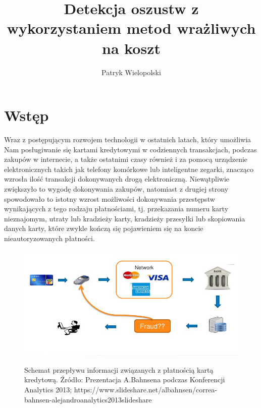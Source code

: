 \documentclass[openany]{book}
\title{Detekcja oszustw z wykorzystaniem metod wrażliwych na koszt}
\author{Patryk Wielopolski}
\begin{document}
	
	\newcommand{\htx}{h_{\theta}(\boldsymbol{x_i})}
	\newcommand{\es}{\mathcal{S}}
	\newcommand{\ef}{\mathcal{F}}
	\newcommand{\iks}{\boldsymbol{x}}
	\newcommand{\bes}{\boldsymbol{S}}
	\newcommand{\yht}[1]{y_i^{(#1)}}
	\newcommand{\ylab}[2]{\text{#1}_{\text{#2}}}
	
	\newenvironment{talign}
	{\align}
	{\endalign}
	
	\newenvironment{talign*}
	{\csname align*\endcsname}
	{\endalign}

\maketitle

\tableofcontents

\chapter{Wstęp}
	Wraz z postępującym rozwojem technologii w ostatnich latach, który umożliwia Nam posługiwanie się kartami kredytowymi w codziennych transakcjach, podczas zakupów w internecie, a także ostatnimi czasy również i za pomocą urządzenie elektronicznych takich jak telefony komórkowe lub inteligentne zegarki, znacząco wzrosła ilość transakcji dokonywanych drogą elektroniczną. Niewątpliwie zwiększyło to wygodę dokonywania zakupów, natomiast z drugiej strony spowodowało to istotny wzrost możliwości dokonywania przestępstw wynikających z tego rodzaju płatnościami, tj. przekazania numeru karty nieznajomym, utraty lub kradzieży karty, kradzieży przesyłki lub skopiowania danych karty, które zwykle kończą się pojawieniem się na koncie nieautoryzowanych płatności.

	\begin{figure}[h]
		\includegraphics[width=\linewidth]{images/credit-card-flow.jpg}
		\label{credit-card-flow}
		\caption{Schemat przepływu informacji związanych z płatnością kartą kredytową. Źródło: Prezentacja A.Bahnsena podczas Konferencji Analytics 2013; https://www.slideshare.net/albahnsen/correa-bahnsen-alejandroanalytics2013slideshare}
	\end{figure}
\end{document}
